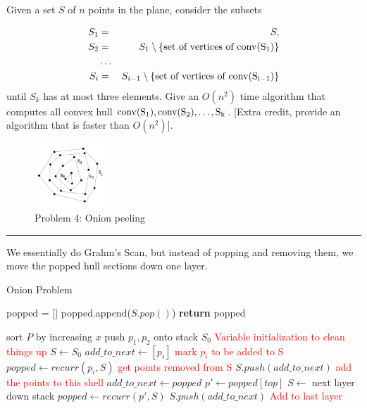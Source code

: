 \documentclass[11pt]{article}
\newcommand{\conv}[1]{\rm{conv}(#1)}
\begin{document}

Given a set $S$ of $n$ points in the plane, consider the subsets

\begin{eqnarray*}
	S_1 &=& S, \\
	S_2 &=& S_1 \setminus \{ \text{set of vertices of } \conv{S_1} \} \\
		&\ldots& \\
	S_i &=& S_{i-1} \setminus \{ \text{set of vertices of } \conv{S_{i-1}} \}
\end{eqnarray*}
%
until $S_k$ has at most three elements.  Give an $O(n^2)$ time algorithm that
computes all convex hull $\conv{S_1}, \conv{S_2}, \ldots, S_k$.  [Extra credit,
provide an algorithm that is faster than $O(n^2)$].

\begin{figure}[h]
    \centering
    \includegraphics[width=0.25\textwidth]{onions}
    \caption{Problem 4: Onion peeling}
\end{figure}
\hrule

We essentially do Grahm's Scan, but instead of popping and removing them,
we move the popped hull sections down one layer.

\begin{algorithm}
    \caption{Onion Problem}
    \label{alg:onion}

    \begin{algorithmic}[1]
            \State popped = []
                \State popped.append($S.pop()$)
            \EndWhile
            \State \textbf{return} popped
        \EndFunction
        \end{algorithmic}

    \begin{algorithmic}[1]
        \State sort $P$ by increasing $x$
        \State push $p_1, p_2$ onto stack $S_0$
            \State \textcolor{red}{Variable initialization to clean things up}
            \State $S \gets S_0$ 
            \State $add\_to\_next \gets [p_i]$ \quad \textcolor{red}{mark $p_i$ to be added to S}
            \State $popped \gets recurr(p_i,S)$ \quad \textcolor{red}{get points removed from S}
                \State $S.push(add\_to\_next)$ \quad \textcolor{red}{add the points to this shell}
                \State $add\_to\_next \gets popped$
                \State $p' \gets popped[top]$
                \State $S \gets$ next layer down stack
                \State $popped \gets recurr(p', S)$
            \EndWhile
            \State $S.push(add\_to\_next)$ \quad \textcolor{red}{Add to last layer}
        \EndFor
    \EndFunction
    \end{algorithmic}
\end{algorithm}
\end{document}
